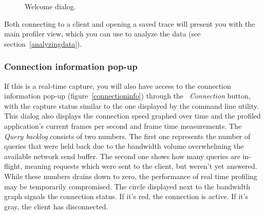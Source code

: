 \documentclass[hidelinks,titlepage,a4paper]{article}
\begin{document}
\begin{figure}[h]
\centering{}
\caption{Welcome dialog.}
\label{welcomedialog}
\end{figure}

Both connecting to a client and opening a saved trace will present you with the main profiler view, which you can use to analyze the data (see section~\ref{analyzingdata}).

\subsubsection{Connection information pop-up}
\label{connectionpopup}

If this is a real-time capture, you will also have access to the connection information pop-up (figure~\ref{connectioninfo}) through the \emph{\faWifi{}~Connection} button, with the capture status similar to the one displayed by the command line utility. This dialog also displays the connection speed graphed over time and the profiled application's current frames per second and frame time measurements. The \emph{Query backlog} consists of two numbers. The first one represents the number of queries that were held back due to the bandwidth volume overwhelming the available network send buffer. The second one shows how many queries are in-flight, meaning requests which were sent to the client, but weren't yet answered. While these numbers drains down to zero, the performance of real time profiling may be temporarily compromised. The circle displayed next to the bandwidth graph signals the connection status. If it's red, the connection is active. If it's gray, the client has disconnected.
\end{document}
